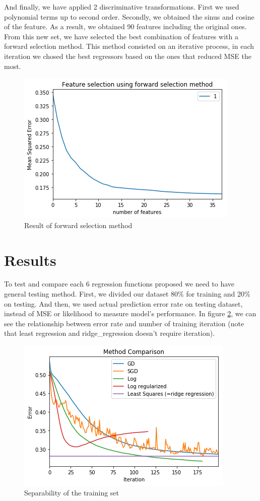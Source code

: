 \documentclass[10pt,conference,compsocconf]{IEEEtran}
\begin{document}
And finally, we have applied 2 discriminative transformations. First we used polynomial terms up to second order. Secondly, we obtained the sinus and cosine of the feature. As a result, we obtained 90 features including the original ones. From this new set, we have selected the best combination of features with a forward selection method. This method consisted on an iterative process, in each iteration we chosed the best regressors based on the ones that reduced MSE the most. %
\begin{tiny}
	\begin{figure}[t]
		\includegraphics[scale=0.5]{Mse.png}   
		\caption{Result of forward selection method }
		\label{fig2}    
	\end{figure}
\end{tiny}


\section{Results}
\label{S1}
To test and compare each 6 regression functions proposed we need to have general testing method. First, we divided our dataset 80\% for training and 20\% on testing. And then, we used actual prediction error rate on testing dataset, instead of MSE or likelihood to measure model's performance. In figure \ref{fig3}, we can see the relationship between error rate and number of training iteration (note that least regression and ridge_regression doesn't require iteration). 

\begin{tiny}
	\begin{figure}[b]
		\includegraphics[scale=0.5]{MethodComp.png}   
		\caption{Separability of the training set }
		\label{fig3}    
	\end{figure}
\end{tiny}
\end{document}
